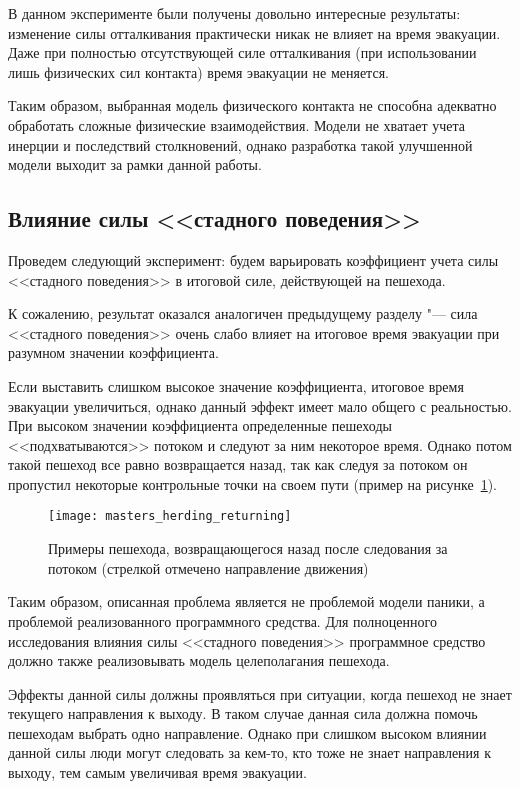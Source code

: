 В данном эксперименте были получены довольно интересные результаты: изменение силы отталкивания практически никак не влияет на время эвакуации.
Даже при полностью отсутствующей силе отталкивания (при использовании лишь физических сил контакта) время эвакуации не меняется.

Таким образом, выбранная модель физического контакта не способна адекватно обработать сложные физические взаимодействия.
Модели не хватает учета инерции и последствий столкновений, однако разработка такой улучшенной модели выходит за рамки данной работы.

\subsection{Влияние силы <<стадного поведения>>}
\label{sec:results:herding}

Проведем следующий эксперимент: будем варьировать коэффициент учета силы <<стадного поведения>> в итоговой силе, действующей на пешехода.

К сожалению, результат оказался аналогичен предыдущему разделу "---
сила <<стадного поведения>> очень слабо влияет на итоговое время эвакуации при разумном значении коэффициента.

Если выставить слишком высокое значение коэффициента, итоговое время эвакуации увеличиться, однако данный эффект имеет мало общего с реальностью.
При высоком значении коэффициента определенные пешеходы <<подхватываются>> потоком и следуют за ним некоторое время.
Однако потом такой пешеход все равно возвращается назад, так как следуя за потоком он пропустил некоторые контрольные точки на своем пути (пример на рисунке~\ref{sec:results:herding:returning}).

\begin{figure}[ht!]
  \centering
  \texttt{[image: masters\_herding\_returning]}
  \caption{Примеры пешехода, возвращающегося назад после следования за потоком (стрелкой отмечено направление движения)}
  \label{sec:results:herding:returning}
\end{figure}

Таким образом, описанная проблема является не проблемой модели паники, а проблемой реализованного программного средства.
Для полноценного исследования влияния силы <<стадного поведения>> программное средство должно также реализовывать модель целеполагания пешехода.

Эффекты данной силы должны проявляться при ситуации, когда пешеход не знает текущего направления к выходу.
В таком случае данная сила должна помочь пешеходам выбрать одно направление.
Однако при слишком высоком влиянии данной силы люди могут следовать за кем-то,
кто тоже не знает направления к выходу, тем самым увеличивая время эвакуации.

